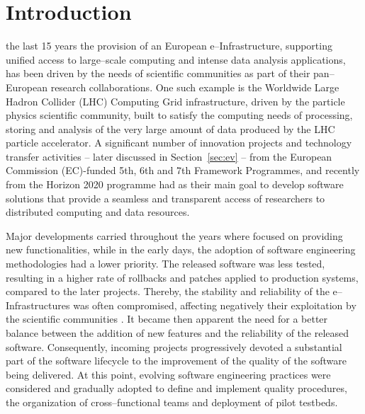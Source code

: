 \documentclass[journal]{IEEEtran}
\begin{document}
\section{Introduction}

 the last 15 years the provision of an European e--Infrastructure,
supporting unified access to large--scale computing and intense data analysis
applications, has been driven by the needs of scientific communities as part of their
pan--European research collaborations. One such example is the Worldwide
Large Hadron Collider (LHC) Computing Grid infrastructure, driven
by the particle physics scientific community, built to satisfy the computing needs
of processing, storing and analysis of the very large amount of data produced by the
LHC particle accelerator. A significant number of innovation projects and technology transfer
activities -- later discussed in Section~\ref{sec:ev} -- from the European Commission
(EC)-funded 5th, 6th and 7th Framework Programmes, and recently from the Horizon 2020 programme
\cite{h2020} had as their main goal to develop software solutions that provide a seamless and
transparent access of researchers to distributed computing and data resources.

Major developments carried throughout the years where focused on providing new
functionalities, while in the early days, the adoption of software engineering methodologies had a lower priority.
The released software was less tested, resulting in a higher rate of
rollbacks and patches applied to production systems, compared to the later projects. Thereby, the stability and
reliability of the e--Infrastructures was often compromised, affecting
negatively their exploitation by the scientific communities \cite{aiftimiei}.
It became then apparent the need for a better balance between the addition of new features
and the reliability of the released software. Consequently, incoming projects progressively
devoted a substantial part of the software lifecycle to the improvement of the quality of the
software being delivered. At this point, evolving software engineering practices were considered
and gradually adopted to define and implement quality procedures, the organization of
cross--functional teams and deployment of pilot testbeds.
\end{document}
